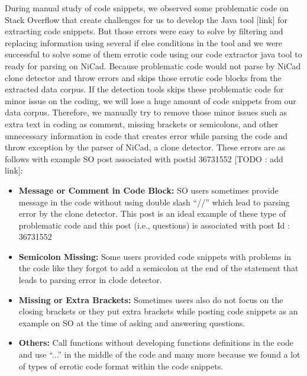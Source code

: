 \documentclass[conference]{IEEEtran}
\begin{document}
	During manual study of code snippets, we observed some problematic code on Stack Overflow that create challenges for us to develop the Java tool [link] for extracting code snippets. But those errors were easy to solve by filtering and replacing information using several if else conditions in the tool and we were successful to solve some of them errotic code using our code extractor java tool to ready for parsing on NiCad. Because problematic code would not parse by NiCad clone detector and throw errors and skips those errotic code blocks from the extracted data corpus. If the detection tools skips these problematic code for minor issue on the coding, we will lose a huge amount of code snippets from our data corpus. Therefore, we manually try to remove those minor issues such as extra text in coding as comment, missing brackets or semicolons, and other unnecessary information in code that creates error while parsing the code and throw exception by the parser of NiCad, a clone detector.  These errors are as follows with example SO post associated with postid 36731552 [TODO : add link]:
	
	\begin{itemize}
		\item \textbf{Message or Comment in Code Block:} SO users sometimes provide message in the code without using double slash “\///” which lead to parsing error by the clone detector. This post is an ideal example of these type of problematic code  and this post (i.e., questions) is associated with post Id : 36731552 
		\item \textbf{Semicolon Missing:} Some users provided code snippets with problems in the code like they forgot to add a semicolon at the end of the statement that leads to parsing error in clode detector.
		\item \textbf{Missing or Extra Brackets:}  Sometimes users also do not focus on the closing brackets or they put extra brackets while posting code snippets as an example on SO at the time of asking and answering questions.
		\item \textbf{Others:} Call functions without developing functions definitions in the code and use “...” in the middle of the code and many more because we found a lot of types of errotic code format within the code snippets.   
	\end{itemize}
	
\end{document}
